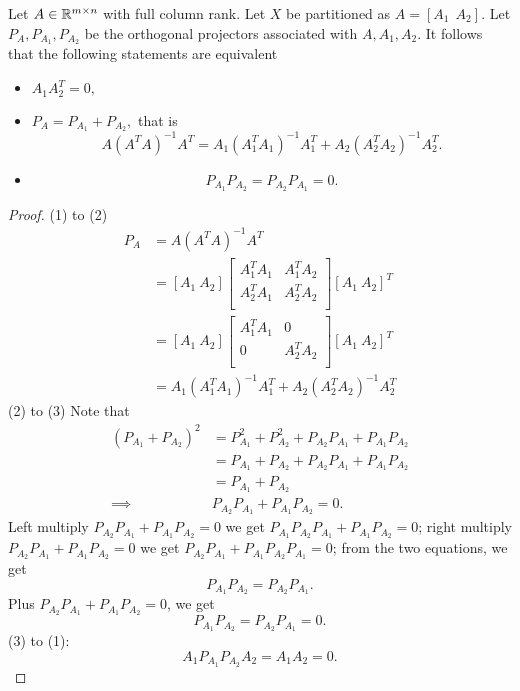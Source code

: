 \begin{refsection}
\begin{lemma}\label{ch:linearalgebra:th:decompositionOfOrthogonalProjectorOrthogonalcolumns}\cite[222]{banerjee2014linear}
	Let $A\in \mathbb{R}^{m\times n}$ with full column rank. Let $X$ be partitioned as $A = [A_1~~ A_2]$. Let $P_A,P_{A_1},P_{A_2}$ be the orthogonal projectors associated with $A,A_1,A_2$.
It follows that the following statements are equivalent
	\begin{itemize}
		\item $A_1A_2^T = 0,$
		\item $P_A = P_{A_1} + P_{A_2},$ that is
		$$A(A^TA)^{-1}A^T =  A_1(A^T_1A_1)^{-1}A^T_1 + A_2(A^T_2A_2)^{-1}A^T_2.$$
		\item $$P_{A_1}P_{A_2} = P_{A_2}P_{A_1} = 0.$$
	\end{itemize}
\end{lemma}
\begin{proof}
	(1) to (2) 
	\begin{align*}
	P_A &= A(A^TA)^{-1}A^T \\
	&=
	[A_1 ~ A_2] \begin{bmatrix}
	A_1^TA_1 & A_1^TA_2 \\
	A_2^TA_1 & A_2^TA_2 \\
	\end{bmatrix} [A_1 ~ A_2]^T \\
	&=
	[A_1 ~ A_2] \begin{bmatrix}
	A_1^TA_1 & 0 \\
	0 & A_2^TA_2 \\
	\end{bmatrix} [A_1 ~ A_2]^T \\ 
	&= A_1(A^T_1A_1)^{-1}A^T_1 + A_2(A^T_2A_2)^{-1}A^T_2
	\end{align*}
	(2) to (3)
	Note that 
	\begin{align*}
	(P_{A_1} + P_{A_2})^2 &= P_{A_1}^2+ P_{A_2}^2+ P_{A_2}P_{A_1}+ P_{A_1}P_{A_2} \\
	&= P_{A_1} + P_{A_2}+ P_{A_2}P_{A_1}+ P_{A_1}P_{A_2}\\
	&= P_{A_1} + P_{A_2}\\
	\implies & P_{A_2}P_{A_1}+ P_{A_1}P_{A_2} = 0.
	\end{align*}
	Left multiply $P_{A_2}P_{A_1}+ P_{A_1}P_{A_2} = 0$ we get
	$P_{A_1}P_{A_2}P_{A_1}+ P_{A_1}P_{A_2} = 0$; right multiply 
	$P_{A_2}P_{A_1}+ P_{A_1}P_{A_2} = 0$ we get
	$P_{A_2}P_{A_1}+ P_{A_1}P_{A_2}P_{A_1} = 0$; from the two equations, we get
	$$P_{A_1}P_{A_2} = P_{A_2}P_{A_1}.$$
	Plus  $P_{A_2}P_{A_1}+ P_{A_1}P_{A_2} = 0$, we get
	$$P_{A_1}P_{A_2} = P_{A_2}P_{A_1} = 0.$$
	(3) to (1):
	$$A_1P_{A_1}P_{A_2}A_2 = A_1A_2 = 0.$$
\end{proof}


\end{refsection}
